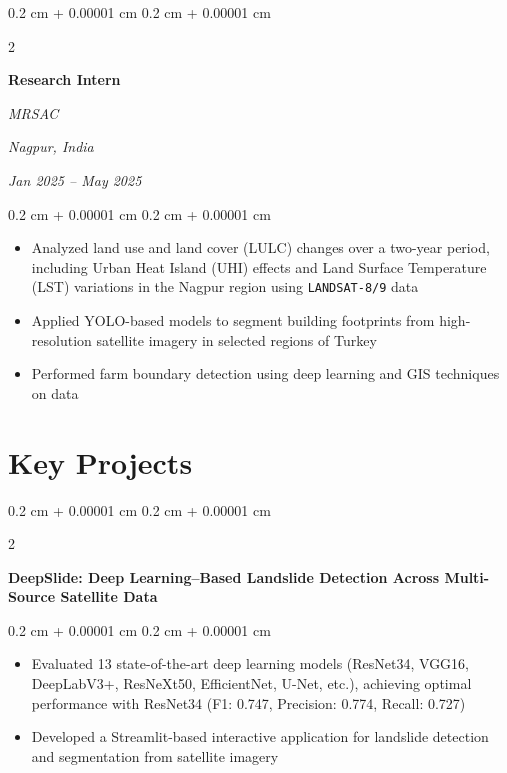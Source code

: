 \documentclass[10pt, letterpaper]{article}
\newenvironment{highlights}{
    \begin{itemize}[
        topsep=0.10 cm,
        parsep=0.10 cm,
        partopsep=0pt,
        itemsep=0pt,
        leftmargin=0.4 cm + 10pt
    ]
}{
    \end{itemize}
} %
\newenvironment{onecolentry}{
    \begin{adjustwidth}{
        0.2 cm + 0.00001 cm
    }{
        0.2 cm + 0.00001 cm
    }
}{
    \end{adjustwidth}
} %
\newenvironment{twocolentry}[2][]{
    \onecolentry
    \def\secondColumn{#2}
    \setcolumnwidth{\fill, 4.5 cm}
    \begin{paracol}{2}
}{
    \switchcolumn \raggedleft \secondColumn
    \end{paracol}
    \endonecolentry
} %
\newenvironment{twocolentryflexible}[2][]{
    \onecolentry
    \def\secondColumn{#2}
    \setcolumnwidth{\fill, 2.5 cm}
    \begin{paracol}{2}
}{
    \switchcolumn \raggedleft \secondColumn
    \end{paracol}
    \endonecolentry
} %
\let\hrefWithoutArrow\href
\renewcommand{\href}[2]{\hrefWithoutArrow{#1}{\ifthenelse{\equal{#2}{}}{ }{#2 }\raisebox{.15ex}{\footnotesize \faExternalLink*}}}
\begin{document}
        \vspace{0.2 cm}

        
        \begin{twocolentry}{
        \textit{Nagpur, India}
        
        \textit{Jan 2025 – May 2025}}
            \textbf{Research Intern}
            
            \textit{MRSAC}
        \end{twocolentry}

        \vspace{0.10 cm}
        \begin{onecolentry}
            \begin{highlights}
                \item Analyzed land use and land cover (LULC) changes over a two-year period, including Urban Heat Island (UHI) effects and Land Surface Temperature (LST) variations in the Nagpur region using \texttt{LANDSAT-8/9} data
                \item Applied YOLO-based models to segment building footprints from high-resolution satellite imagery in selected regions of Turkey
                \item Performed farm boundary detection using deep learning and GIS techniques on data
            \end{highlights}
        \end{onecolentry}

        \vspace{0.2 cm}


    
    \section{Key Projects}


        \begin{twocolentryflexible}{
            
            
        \textit{\href{https://github.com/HarshShinde0/Deepslide}{Github}}}
            \textbf{DeepSlide: Deep Learning–Based Landslide Detection Across Multi-Source Satellite Data}
        \end{twocolentryflexible}

        \vspace{0.10 cm}
        \begin{onecolentry}
            \begin{highlights}
                \item Evaluated 13 state-of-the-art deep learning models (ResNet34, VGG16, DeepLabV3+, ResNeXt50, EfficientNet, U-Net, etc.), achieving optimal performance with ResNet34 (F1: 0.747, Precision: 0.774, Recall: 0.727)
                \item Developed a Streamlit-based interactive application for landslide detection and segmentation from satellite imagery
            \end{highlights}
        \end{onecolentry}
\end{document}
